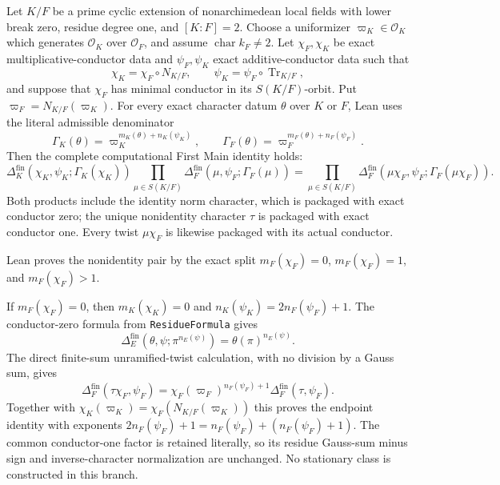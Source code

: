 \begin{theorem}\label{mod:cases-tamequadratic}
Let $K/F$ be a prime cyclic extension of nonarchimedean local fields with
lower break zero, residue degree one, and $[K:F]=2$.  Choose a uniformizer
$\varpi_K\in\mathcal O_K$ which generates $\mathcal O_K$ over
$\mathcal O_F$, and assume $\operatorname{char}k_F\ne2$.  Let
$\chi_F,\chi_K$ be exact multiplicative-conductor data and
$\psi_F,\psi_K$ exact additive-conductor data such that
\[
 \chi_K=\chi_F\circ N_{K/F},\qquad
 \psi_K=\psi_F\circ\operatorname{Tr}_{K/F},
\]
and suppose that $\chi_F$ has minimal conductor in its
$S(K/F)$-orbit.  Put $\varpi_F=N_{K/F}(\varpi_K)$.  For every exact
character datum $\theta$ over $K$ or $F$, Lean uses the literal admissible
denominator
\[
 \Gamma_K(\theta)=\varpi_K^{m_K(\theta)+n_K(\psi_K)},\qquad
 \Gamma_F(\theta)=\varpi_F^{m_F(\theta)+n_F(\psi_F)}.
\]
Then the complete computational First Main identity holds:
\[
 \Delta_K^{\mathrm{fin}}(\chi_K,\psi_K;\Gamma_K(\chi_K))
 \prod_{\mu\in S(K/F)}
   \Delta_F^{\mathrm{fin}}(\mu,\psi_F;\Gamma_F(\mu))
 =
 \prod_{\mu\in S(K/F)}
   \Delta_F^{\mathrm{fin}}(\mu\chi_F,\psi_F;
     \Gamma_F(\mu\chi_F)).
\]
Both products include the identity norm character, which is packaged with
exact conductor zero; the unique nonidentity character $\tau$ is packaged
with exact conductor one.  Every twist $\mu\chi_F$ is likewise packaged
with its actual conductor.

Lean proves the nonidentity pair by the exact split
$m_F(\chi_F)=0$, $m_F(\chi_F)=1$, and $m_F(\chi_F)>1$.

If $m_F(\chi_F)=0$, then $m_K(\chi_K)=0$ and
$n_K(\psi_K)=2n_F(\psi_F)+1$.  The conductor-zero formula from
\texttt{ResidueFormula} gives
\[
 \Delta_E^{\mathrm{fin}}(\theta,\psi;\pi^{n_E(\psi)})
 =\theta(\pi)^{n_E(\psi)}.
\]
The direct finite-sum unramified-twist calculation, with no division by a
Gauss sum, gives
\[
 \Delta_F^{\mathrm{fin}}(\tau\chi_F,\psi_F)
 =\chi_F(\varpi_F)^{n_F(\psi_F)+1}
   \Delta_F^{\mathrm{fin}}(\tau,\psi_F).
\]
Together with
$\chi_K(\varpi_K)=\chi_F(N_{K/F}(\varpi_K))$ this proves the endpoint
identity with exponents
$2n_F(\psi_F)+1=n_F(\psi_F)+(n_F(\psi_F)+1)$.  The common
conductor-one factor is retained literally, so its residue Gauss-sum minus
sign and inverse-character normalization are unchanged.  No stationary
class is constructed in this branch.


\end{theorem}
